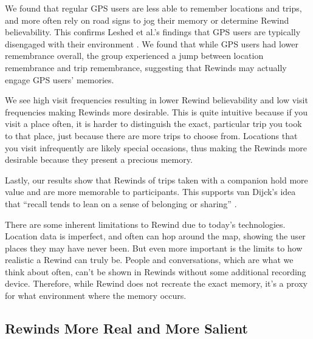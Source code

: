 \documentclass{sigchi}
\begin{document}
We found that regular GPS users are less able to remember locations and trips, and more often rely on road signs to jog their memory or determine Rewind believability. This confirms Leshed et al.'s findings that GPS users are typically disengaged with their environment \cite{leshed2008car}. We found that while GPS users had lower remembrance overall, the group experienced a jump between location remembrance and trip remembrance, suggesting that Rewinds may actually engage GPS users' memories. 

We see high visit frequencies resulting in lower Rewind believability and low visit frequencies making Rewinds more desirable. This is quite intuitive because if you visit a place often, it is harder to distinguish the exact, particular trip you took to that place, just because there are more trips to choose from. Locations that you visit infrequently are likely special occasions, thus making the Rewinds more desirable because they present a precious memory.

Lastly, our results show that Rewinds of trips taken with a companion hold more value and are more memorable to participants. This supports van Dijck's idea that ``recall tends to lean on a sense of belonging or sharing'' \cite{van2007mediated}.

		

There are some inherent limitations to Rewind due to today's technologies. Location data is imperfect, and often can hop around the map, showing the user places they may have never been. But even more important is the limits to how realistic a Rewind can truly be. People and conversations, which are what we think about often, can't be shown in Rewinds without some additional recording device. Therefore, while Rewind does not recreate the exact memory, it's a proxy for what environment where the memory occurs.

\subsection{Rewinds More Real and More Salient}
\end{document}
